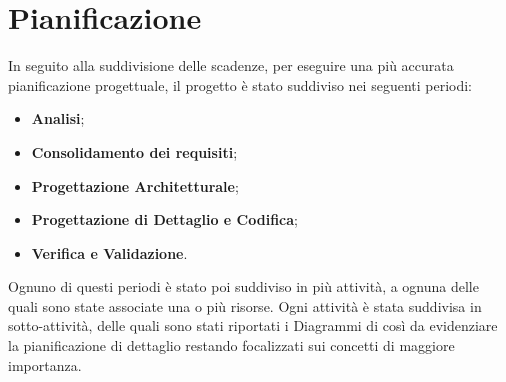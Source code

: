 \section{Pianificazione}
	In seguito alla suddivisione delle scadenze, per eseguire una più accurata pianificazione progettuale, il progetto è stato suddiviso nei seguenti periodi: \\
	\begin{itemize}
		\item \textbf{Analisi}; \\
		\item \textbf{Consolidamento dei requisiti}; \\
		\item \textbf{Progettazione Architetturale}; \\
		\item \textbf{Progettazione di Dettaglio e Codifica}; \\
		\item \textbf{Verifica e Validazione}. \\
	\end{itemize}
	Ognuno di questi periodi è stato poi suddiviso in più attività, a ognuna delle quali sono state associate una o più risorse. Ogni attività è stata suddivisa in sotto-attività, delle quali sono stati riportati i Diagrammi di  così da evidenziare la pianificazione di dettaglio restando focalizzati sui concetti di maggiore importanza.
